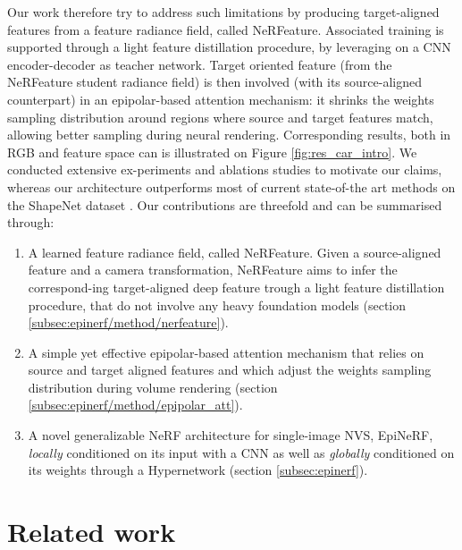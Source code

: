 Our work therefore try to address such limitations by producing target-aligned features from a feature radiance field, called NeRFeature. Associated training is supported through a light feature distillation procedure, by leveraging on a CNN encoder-decoder as teacher network. Target oriented feature (from the NeRFeature student radiance field) is then involved (with its source-aligned counterpart) in an epipolar-based attention mechanism: it shrinks the weights sampling distribution around regions where source and target features match, allowing better sampling during neural rendering. Corresponding results, both in RGB and feature space can is illustrated on Figure \ref{fig:res_car_intro}. We conducted extensive ex\--periments and ablations studies to motivate our claims, whereas our architecture outperforms most of current state-of-the art methods on the ShapeNet dataset \citep{chang2015shapenet}. Our contributions are threefold and can be summarised through: 
\begin{enumerate}
   \item A learned feature radiance field, called NeRFeature. Given a source-aligned feature and a camera transformation, NeRFeature aims to infer the correspond\--ing target-aligned deep feature trough a light feature distillation procedure, that do not involve any heavy foundation models (section \ref{subsec:epinerf/method/nerfeature}). 
    \item A simple yet effective epipolar-based attention mechanism that relies on source and target aligned features and which adjust the weights sampling distribution during volume rendering (section \ref{subsec:epinerf/method/epipolar_att}). 
    \item A novel generalizable NeRF architecture for single-image NVS, EpiNeRF, \textit{locally} conditioned on its input with a CNN as well as \textit{globally} conditioned on its weights through a Hypernetwork (section \ref{subsec:epinerf}).  
\end{enumerate}

\section{Related work}
\label{sec:epinerf/rw}

